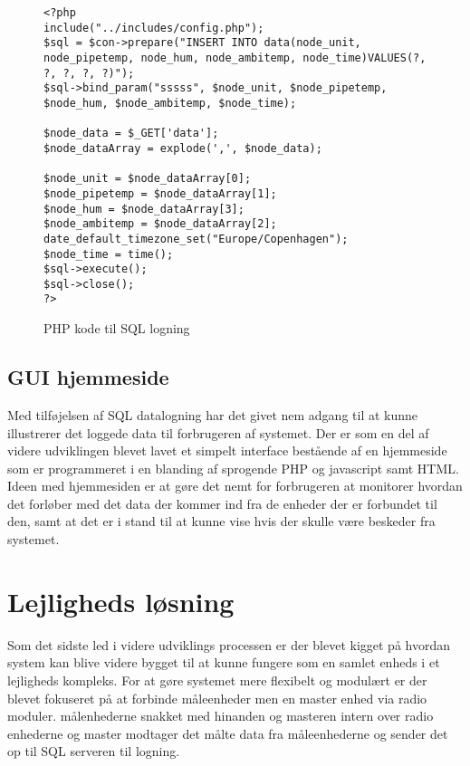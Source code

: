 \begin{figure}[!ht]
	\begin{lstlisting}
<?php
include("../includes/config.php");
$sql = $con->prepare("INSERT INTO data(node_unit, node_pipetemp, node_hum, node_ambitemp, node_time)VALUES(?, ?, ?, ?, ?)");
$sql->bind_param("sssss", $node_unit, $node_pipetemp, $node_hum, $node_ambitemp, $node_time);

$node_data = $_GET['data'];
$node_dataArray = explode(',', $node_data);

$node_unit = $node_dataArray[0];
$node_pipetemp = $node_dataArray[1];
$node_hum = $node_dataArray[3];
$node_ambitemp = $node_dataArray[2];
date_default_timezone_set("Europe/Copenhagen"); 
$node_time = time(); 
$sql->execute();
$sql->close();
?>
\end{lstlisting}
\caption{PHP kode til SQL logning}
\label{phpsql}
\end{figure}

\subsection{GUI hjemmeside}
Med tilføjelsen af SQL datalogning har det givet nem adgang til at kunne illustrerer det loggede data til forbrugeren af systemet.
Der er som en del af videre udviklingen blevet lavet et simpelt interface bestående af en hjemmeside som er programmeret i en blanding af sprogende PHP og javascript samt HTML.
\newline
Ideen med hjemmesiden er at gøre det nemt for forbrugeren at monitorer hvordan det forløber med det data der kommer ind fra de enheder der er forbundet til den, samt at det er i stand til at kunne vise hvis der skulle være beskeder fra systemet.

\section{Lejligheds løsning}
Som det sidste led i videre udviklings processen er der blevet kigget på hvordan system kan blive videre bygget til at kunne fungere som en samlet enheds i et lejligheds kompleks. For at gøre systemet mere flexibelt og modulært er der blevet fokuseret på at forbinde måleenheder men en master enhed via radio moduler. målenhederne snakket med hinanden og masteren intern over radio enhederne og master modtager det målte data fra måleenhederne og sender det op til SQL serveren til logning.

